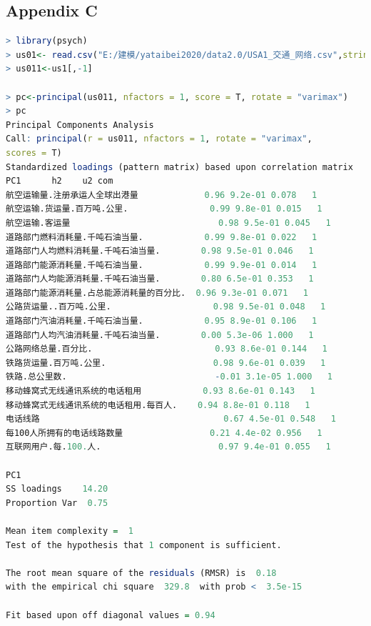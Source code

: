 \documentclass{apmcmthesis}
\begin{document}
\subsection{Appendix C}
\begin{lstlisting}[language=r]
> library(psych)
> us01<- read.csv("E:/建模/yataibei2020/data2.0/USA1_交通_网络.csv",stringsAsFactors = FALSE)
> us011<-us1[,-1]

> pc<-principal(us011, nfactors = 1, score = T, rotate = "varimax")
> pc
Principal Components Analysis
Call: principal(r = us011, nfactors = 1, rotate = "varimax", 
scores = T)
Standardized loadings (pattern matrix) based upon correlation matrix
PC1      h2    u2 com
航空运输量.注册承运人全球出港量             0.96 9.2e-01 0.078   1
航空运输.货运量.百万吨.公里.                0.99 9.8e-01 0.015   1
航空运输.客运量                             0.98 9.5e-01 0.045   1
道路部门燃料消耗量.千吨石油当量.            0.99 9.8e-01 0.022   1
道路部门人均燃料消耗量.千吨石油当量.        0.98 9.5e-01 0.046   1
道路部门能源消耗量.千吨石油当量.            0.99 9.9e-01 0.014   1
道路部门人均能源消耗量.千吨石油当量.        0.80 6.5e-01 0.353   1
道路部门能源消耗量.占总能源消耗量的百分比.  0.96 9.3e-01 0.071   1
公路货运量..百万吨.公里.                    0.98 9.5e-01 0.048   1
道路部门汽油消耗量.千吨石油当量.            0.95 8.9e-01 0.106   1
道路部门人均汽油消耗量.千吨石油当量.        0.00 5.3e-06 1.000   1
公路网络总量.百分比.                        0.93 8.6e-01 0.144   1
铁路货运量.百万吨.公里.                     0.98 9.6e-01 0.039   1
铁路.总公里数.                             -0.01 3.1e-05 1.000   1
移动蜂窝式无线通讯系统的电话租用            0.93 8.6e-01 0.143   1
移动蜂窝式无线通讯系统的电话租用.每百人.    0.94 8.8e-01 0.118   1
电话线路                                    0.67 4.5e-01 0.548   1
每100人所拥有的电话线路数量                 0.21 4.4e-02 0.956   1
互联网用户.每.100.人.                       0.97 9.4e-01 0.055   1

PC1
SS loadings    14.20
Proportion Var  0.75

Mean item complexity =  1
Test of the hypothesis that 1 component is sufficient.

The root mean square of the residuals (RMSR) is  0.18 
with the empirical chi square  329.8  with prob <  3.5e-15 

Fit based upon off diagonal values = 0.94


\end{lstlisting}
\end{document}
